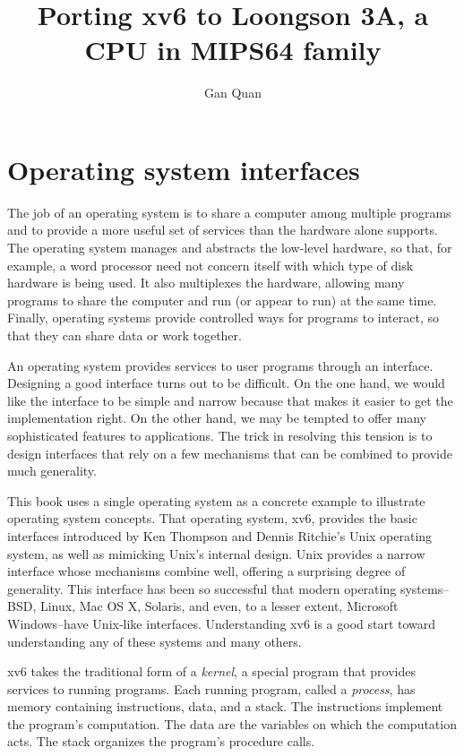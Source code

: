 \documentclass{report}
\begin{document}
	\title{
		Porting xv6 to Loongson 3A, a CPU in MIPS64
		family
	}
	\author{Gan Quan}
	\maketitle
	
	\tableofcontents
	
	\chapter{Operating system interfaces}
	The job of an operating system is to share a computer among multiple programs
	and to provide a more useful set of services than the hardware alone supports. The
	operating system manages and abstracts the low-level hardware, so that, for example, a
	word processor need not concern itself with which type of disk hardware is being
	used. It also multiplexes the hardware, allowing many programs to share the computer
	and run (or appear to run) at the same time. Finally, operating systems provide
	controlled ways for programs to interact, so that they can share data or work together.
	
	An operating system provides services to user programs through an interface.
	Designing a good interface turns out to be difficult. On the one hand, we would like
	the interface to be simple and narrow because that makes it easier to get the
	implementation right. On the other hand, we may be tempted to offer many sophisticated
	features to applications. The trick in resolving this tension is to design interfaces that
	rely on a few mechanisms that can be combined to provide much generality.
	
	This book uses a single operating system as a concrete example to illustrate operating 
	system concepts. That operating system, xv6, provides the basic interfaces introduced 
	by Ken Thompson and Dennis Ritchie's Unix operating system, as well as mimicking
	Unix's internal design. Unix provides a narrow interface whose mechanisms
	combine well, offering a surprising degree of generality. This interface has been so
	successful that modern operating systems--BSD, Linux, Mac OS X, Solaris, and even,
	to a lesser extent, Microsoft Windows--have Unix-like interfaces. Understanding xv6
	is a good start toward understanding any of these systems and many others.
	
	xv6 takes the traditional form of a \emph{kernel}, a special program that provides 
	services to running programs. Each running program, called a
	\emph{process}, has memory containing instructions, data, and a stack. The instructions 
	implement the program's computation. The data are the variables on which the computation 
	acts. The stack organizes the program's procedure calls.
	
\end{document}
